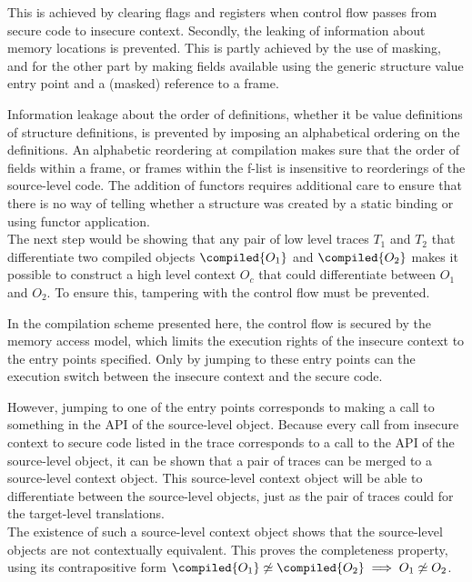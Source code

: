 This is achieved by clearing flags and registers\cite{Agten:2012:SCM:2354412.2355247} when control flow passes from secure code to insecure context.
Secondly, the leaking of information about memory locations is prevented.
This is partly achieved by the use of  masking\cite{Patrignani}, and for the other part by making fields available using the generic structure value entry point and a (masked) reference to a frame.

Information leakage about the order of definitions, whether it be value definitions of structure definitions, is prevented by imposing an alphabetical ordering on the definitions.
An alphabetic reordering at compilation makes sure that the order of fields within a frame, or frames within the f-list is insensitive to reorderings of the source-level code.
The addition of functors requires additional care to ensure that there is no way of telling whether a structure was created by a static binding or using functor application.
\\[1em]
The next step would be showing that any pair of low level traces $T_1$ and $T_2$ that differentiate two compiled objects $\compiled{O_1}$ and $\compiled{O_2}$ makes it possible to construct a high level context $O_c$ that could differentiate between $O_1$ and $O_2$.
To ensure this, tampering with the control flow must be prevented.

In the compilation scheme presented here, the control flow is secured by the memory access model, which limits the execution rights of the insecure context to the entry points specified.
Only by jumping to these entry points can the execution switch between the insecure context and the secure code.

However, jumping to one of the entry points corresponds to making a call to something in the API of the source-level object.
Because every call from insecure context to secure code listed in the trace corresponds to a call to the API of the source-level object, it can be shown that a pair of traces can be merged to a source-level context object. 
This source-level context object will be able to differentiate between the source-level objects, just as the pair of traces could for the target-level translations.
\\[1em]
The existence of such a source-level context object shows that the source-level objects are not contextually equivalent.
This proves the completeness property, using its contrapositive form $\compiled{O_{1}} \not\simeq \compiled{O_{2}} \implies O_{1} \not\simeq O_{2}$.
